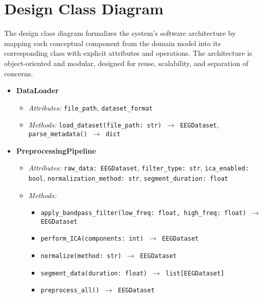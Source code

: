\newpageafter


\section{Design Class Diagram}
\label{sec:design-class-diagram}

The design class diagram formalizes the system's software architecture by mapping each conceptual component from the domain model into its corresponding class with explicit attributes and operations. The architecture is object-oriented and modular, designed for reuse, scalability, and separation of concerns.

\begin{itemize}
    \item \textbf{DataLoader}
    \begin{itemize}
        \item \textit{Attributes:} \texttt{file\_path}, \texttt{dataset\_format}
        \item \textit{Methods:} \texttt{load\_dataset(file\_path: str) $\rightarrow$ EEGDataset}, \texttt{parse\_metadata() $\rightarrow$ dict}
    \end{itemize}

    \item \textbf{PreprocessingPipeline}
    \begin{itemize}
        \item \textit{Attributes:} \texttt{raw\_data: EEGDataset}, \texttt{filter\_type: str}, \texttt{ica\_enabled: bool}, \texttt{normalization\_method: str}, \texttt{segment\_duration: float}
        \item \textit{Methods:}
        \begin{itemize}
            \item \texttt{apply\_bandpass\_filter(low\_freq: float, high\_freq: float) $\rightarrow$ EEGDataset}
            \item \texttt{perform\_ICA(components: int) $\rightarrow$ EEGDataset}
            \item \texttt{normalize(method: str) $\rightarrow$ EEGDataset}
            \item \texttt{segment\_data(duration: float) $\rightarrow$ list[EEGDataset]}
            \item \texttt{preprocess\_all() $\rightarrow$ EEGDataset}
        \end{itemize}
    \end{itemize}


\end{itemize}
